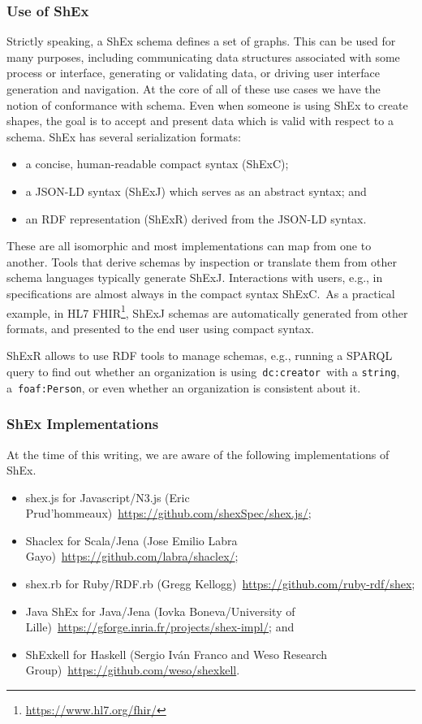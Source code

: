 \subsubsection{Use of ShEx}
Strictly speaking, a ShEx schema defines a set of graphs. This can be used for many purposes, including
communicating data structures associated with some process or interface, generating or validating data,
or driving user interface generation and navigation. At the core of all of these use cases we have the notion
of conformance with schema. Even when someone is using ShEx to create shapes, the goal is to accept and present
data which is valid with respect to a schema. ShEx has several serialization formats:

\begin{itemize}
	\item a concise, human-readable compact syntax (ShExC);
	\item a JSON-LD syntax (ShExJ) which serves as an abstract syntax; and
	\item an RDF representation (ShExR) derived from the JSON-LD syntax.
\end{itemize}

These are all isomorphic and most implementations can map from one to another.
Tools that derive schemas by inspection or translate them from other schema languages typically generate ShExJ.
Interactions with users, e.g., in specifications are almost always in the compact syntax ShExC. As a practical
example, in HL7 FHIR\footnote{\url{https://www.hl7.org/fhir/}}, ShExJ schemas are automatically generated from other formats, and presented to the end
user using compact syntax.

ShExR allows to use RDF tools to manage schemas, e.g., running a SPARQL query to find out whether an organization
is using \texttt{dc:creator} with a \texttt{string}, a \texttt{foaf:Person}, or even whether an organization is consistent about it.

\subsubsection{ShEx Implementations}
At the time of this writing, we are aware of the following implementations of ShEx.

\begin{itemize}
	\item shex.js for Javascript/N3.js (Eric Prud’hommeaux) \url{https://github.com/shexSpec/shex.js/};
	\item Shaclex for Scala/Jena (Jose Emilio Labra Gayo) \url{https://github.com/labra/shaclex/};
	\item shex.rb for Ruby/RDF.rb (Gregg Kellogg) \url{https://github.com/ruby-rdf/shex};
	\item Java ShEx for Java/Jena (Iovka Boneva/University of Lille) \url{https://gforge.inria.fr/projects/shex-impl/}; and
	\item ShExkell for Haskell (Sergio Iván Franco and Weso Research Group) \url{https://github.com/weso/shexkell}.
\end{itemize}


